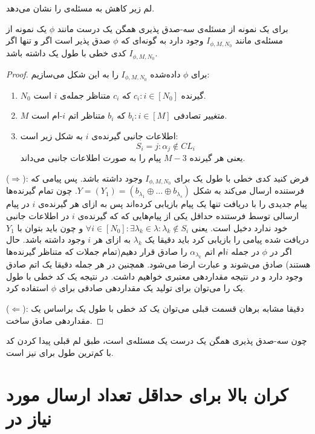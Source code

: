 لم زیر کاهش به مسئله‌ی
\picod
را نشان می‌دهد.
\begin{lemma}
	برای یک نمونه از مسئله‌ی سه-صدق پذیری همگن یک درست مانند
	$\phi$
	یک نمونه از مسئله‌ی
	\picod
	مانند
	$I_{\phi, M, N_0}$
	وجود دارد به گونه‌ای که 
	$\phi$
	صدق پذیر است اگر و تنها اگر 
	$I_{\phi, M, N_0}$
	کدی خطی با طول یک داشته باشد.
\end{lemma}
\begin{proof}
	برای
	$\phi$
	داده‌شده
		$I_{\phi, M, N_0}$
		را به این شکل می‌سازیم:
		\begin{enumerate}
			\item
			$N_0$
			گیرنده
			$c_i: i \in [N_0]$
			که
			$c_i$
			متناظر جمله‌ی
			$i$
			است.
			\item
			$M$
			متغییر تصادفی
			$b_i: i \in [M]$
			 که 
			 $b_i$
			 متناظر اتم‌
			 $i$-ام
			 است.
			 \item 
			 اطلاعات جانبی گیرنده‌ی
			 $i$
			 به شکل زیر است:
			 $$S_i = {j: \alpha_j \notin CL_i}$$
			 یعنی هر گیرنده
			 $M - 3$
			 پیام را به صورت اطلاعات جانبی می‌داند.
		\end{enumerate}
		($\Rightarrow$):
		فرض کنید کدی خطی با طول یک برای
			$I_{\phi, M, N_0}$
			وجود داشته باشد. پس پیامی که فرستنده ارسال می‌کند به شکل
			$Y = (Y_1) = (b_{\lambda_1} \oplus \ldots \oplus b_{\lambda_s})$.
			چون تمام گیرنده‌ها پیام جدیدی را با دریافت تنها یک پیام بازیابی کرده‌اند پس به ازای هر گیرنده‌ی $i$ در پیام ارسالی توسط فرستنده حداقل یکی از پیام‌هایی که که گیرنده‌ی $i$ در اطلاعات جانبی خود ندارد دخیل است. یعنی
			$\forall i \in [N_0]: \exists \lambda_k \in \lambda: \lambda_k \notin S_i$
			و چون باید بتوان با 
			$Y_1$
			دریافت شده پیامی را بازیابی کرد باید دقیقا یک
			$\lambda_k$
			به ازای هر
			$i$
			وجود داشته باشد. حال اگر در
			$\phi$
			در جمله
			$i$ام اتم
			$\alpha_{\lambda_k}$
			را صادق قرار دهیم(تمام جملات که متناظر گیرنده‌ها هستند) صادق می‌شوند و عبارت ارضا می‌شود. همچنین در هر جمله دقیقا یک اتم صادق وجود دارد و در نتیجه مقداردهی معتبری خواهیم داشت. در نتیجه یک کد خطی با طول یک را می‌توان برای تولید یک مقداردهی صادقی برای
			$\phi$
			استفاده کرد.
			
			($\Leftarrow$):
			دقیقا مشابه برهان قسمت قبلی می‌توان یک کد خطی با طول یک براساس یک مقداردهی صادق ساخت.
\end{proof}
چون سه-صدق پذیری همگن یک درست یک مسئله‌ی
\nphard
است، طبق لم قبلی پیدا کردن کد با کم‌ترین طول برای
\lpicod 
نیز
\nphard
است.
\section{کران بالا برای حداقل تعداد ارسال مورد نیاز در
\picod}
